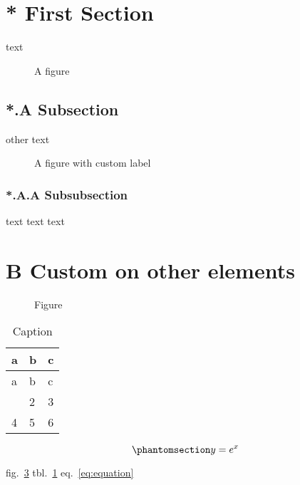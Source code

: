 \section{* First Section}\label{first-section}

text

\begin{figure}
\centering
{}
\caption{A figure}\label{fig:fig1}
\end{figure}

\subsection{*.A Subsection}\label{subsection}

other text

\begin{figure}
\centering
{}
\caption{A figure with custom label}\label{fig:fig2}
\end{figure}

\subsubsection{*.A.A Subsubsection}\label{subsubsection}

text text text

\section{B Custom on other elements}\label{custom-on-other-elements}

\begin{figure}
\centering
{}
\caption{Figure}\label{fig:fig3}
\end{figure}

\begin{longtable}[]{@{}lll@{}}
\caption{\label{tbl:table}Caption}\tabularnewline
\toprule\noalign{}
a & b & c \\
\midrule\noalign{}
\endfirsthead
\toprule\noalign{}
a & b & c \\
\midrule\noalign{}
\endhead
\bottomrule\noalign{}
\endlastfoot
1 & 2 & 3 \\
4 & 5 & 6 \\
\end{longtable}

\begin{equation}\protect\phantomsection\label{eq:equation}{y = e^x}\end{equation}

fig.~\ref{fig:fig3} tbl.~\ref{tbl:table} eq.~\ref{eq:equation}
